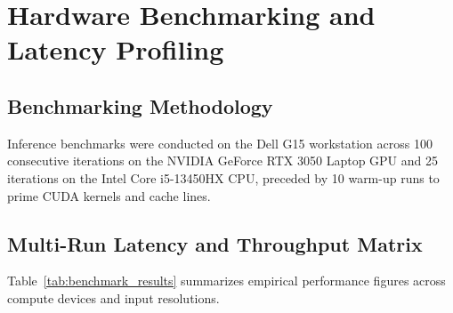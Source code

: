 \documentclass[12pt,a4paper,oneside]{report}
\begin{document}
\chapter{Hardware Benchmarking and Latency Profiling}
\label{ch:benchmarks}

\section{Benchmarking Methodology}
Inference benchmarks were conducted on the Dell G15 workstation across 100 consecutive iterations on the NVIDIA GeForce RTX 3050 Laptop GPU and 25 iterations on the Intel Core i5-13450HX CPU, preceded by 10 warm-up runs to prime CUDA kernels and cache lines.

\section{Multi-Run Latency and Throughput Matrix}
Table~\ref{tab:benchmark_results} summarizes empirical performance figures across compute devices and input resolutions.

\begin{table}[htbp]
\caption{Empirical inference latency and throughput benchmarks}
\label{tab:benchmark_results}
\centering
{}
\end{table}
\end{document}
